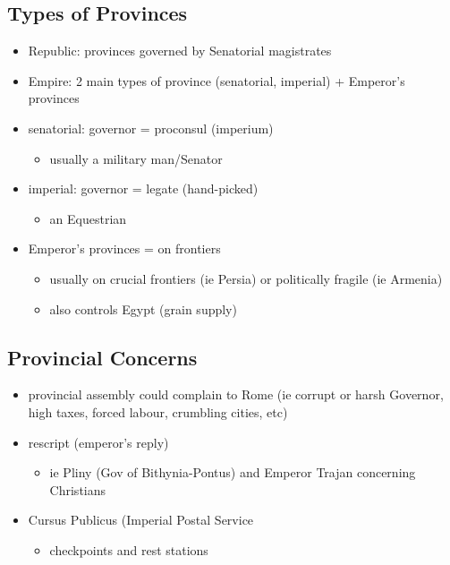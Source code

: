 \documentclass[12pt, twoside]{article}
\begin{document}
\subsection{Types of Provinces}
\begin{itemize}
\item Republic: provinces governed by Senatorial magistrates
\item Empire: 2 main types of province (senatorial, imperial) + Emperor’s provinces
\item senatorial: governor = proconsul (imperium)
	\begin{itemize}
	\item usually a military man/Senator
	\end{itemize}
\item imperial: governor = legate (hand-picked)
	\begin{itemize}
	\item an Equestrian
	\end{itemize}
\item Emperor's provinces = on frontiers
	\begin{itemize}
	\item usually on crucial frontiers (ie Persia) or politically fragile (ie Armenia)
	\item also controls Egypt (grain supply)
	\end{itemize}
\end{itemize}

\subsection{Provincial Concerns}
\begin{itemize}
\item provincial assembly could complain to Rome (ie corrupt or harsh Governor, high taxes, forced labour, crumbling cities, etc)
\item rescript (emperor's reply)	
	\begin{itemize}
	\item ie Pliny (Gov of Bithynia-Pontus) and Emperor Trajan concerning Christians
	\end{itemize}
\item Cursus Publicus (Imperial Postal Service
	\begin{itemize}
	\item checkpoints and rest stations
	\end{itemize}
\end{itemize}
\end{document}
